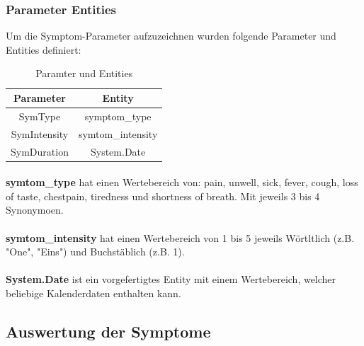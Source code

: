 \documentclass[11pt,a4paper]{article}
\begin{document}
        \subsubsection{Parameter Entities}
            Um die Symptom-Parameter aufzuzeichnen wurden folgende Parameter und Entities definiert:
            \begin{table}[!h]
                \begin{center}
                    \begin{tabular}{c|c}
                        \textbf{Parameter} & \textbf{Entity}\\
                        \hline
                        SymType & symptom\_type\\
                        SymIntensity & symtom\_intensity\\
                        SymDuration & System.Date
                    \end{tabular}
                    \caption{Paramter und Entities}
                    \label{tab:tabelleParamsUndEntities}
                \end{center}
            \end{table}
            
            \paragraph{}
                \textbf{symtom\_type} hat einen Wertebereich von: pain, unwell,
                sick, fever, cough, loss of taste, chestpain, tiredness und shortness of breath. Mit jeweils 3 bis 4 
                Synonymoen.
            
            \paragraph{}
                \textbf{symtom\_intensity} hat einen Wertebereich von 1 bis 5 jeweils Wörtltlich (z.B. "One", "Eins") und
                Buchstäblich (z.B. 1).
            
            \paragraph{}
                \textbf{System.Date} ist ein vorgefertigtes Entity mit einem Wertebereich, welcher beliebige Kalenderdaten
                enthalten kann.
    \subsection{Auswertung der Symptome}
\end{document}
